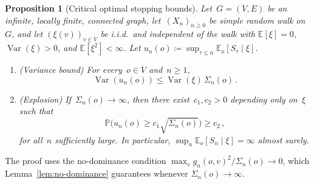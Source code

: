 \documentclass[11pt]{amsart}
\theoremstyle{plain}
\newtheorem{proposition}[theorem]{Proposition}
\theoremstyle{definition}
\newcommand{\E}{\mathbb{E}}
\renewcommand{\P}{\mathbb{P}}
\DeclareMathOperator{\var}{Var}
\begin{document}
	\begin{proposition}[Critical optimal stopping bounds]\label{prop:critical}
		Let~$G = (V,E)$ be an infinite, locally finite, connected graph, let~$(X_n)_{n\geq 0}$ be simple random walk on~$G$, and let $(\xi(v))_{v\in V}$ be i.i.d.\ and independent of the walk with
		$\E[\xi]=0$, $\var(\xi)>0$, and $\E[\xi^2]<\infty$.
		Let $u_n(o)\coloneqq\sup_{\tau\leq n}\E_o[S_\tau\mid\xi]$.
		
		\begin{enumerate}[label=\textup{(\alph*)}]
			\item \textup{(Variance bound)}\;
			For every~$o\in V$ and~$n\geq 1$,
			\begin{equation}\label{eq:ES-bound}
				\var(u_n(o))\leq\var(\xi)\,\Sigma_n(o)\,.
			\end{equation}
			\item \textup{(Explosion)}\;
			If~$\Sigma_n(o)\to\infty$, then there exist~$c_1,c_2>0$ depending only on~$\xi$ such that
			\begin{equation}\label{eq:PZ-bound}
				\P\bigl(u_n(o)\geq c_1\sqrt{\Sigma_n(o)}\bigr)\geq c_2\,,
			\end{equation}
			for all~$n$ sufficiently large.
			In particular, $\sup_n\E_o[S_n\mid\xi]=\infty$ almost surely.
		\end{enumerate}
	\end{proposition}
	
	The proof uses the no-dominance condition $\max_v g_n(o,v)^2/\Sigma_n(o)\to 0$, which Lemma~\ref{lem:no-dominance} guarantees whenever $\Sigma_n(o)\to\infty$.
	
\end{document}
